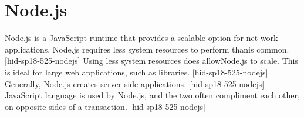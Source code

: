 \section{Node.js}


Node.js is a JavaScript runtime that provides a scalable 
option for net-work applications. Node.js requires less 
system resources to perform thanis common. 
[hid-sp18-525-nodejs] Using less system resources does 
allowNode.js to scale. This is ideal for large web 
applications, such as libraries. [hid-sp18-525-nodejs] 
Generally, Node.js creates server-side applications. 
[hid-sp18-525-nodejs] JavaScript language is used by 
Node.js, and the two often compliment each
other, on opposite sides of a transaction. 
[hid-sp18-525-nodejs]
